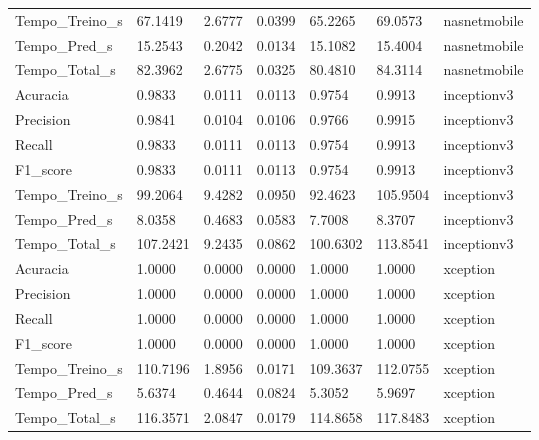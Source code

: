 \begin{tabular}{lllllll}
Tempo_Treino_s & 67.1419 & 2.6777 & 0.0399 & 65.2265 & 69.0573 & nasnetmobile \\
Tempo_Pred_s & 15.2543 & 0.2042 & 0.0134 & 15.1082 & 15.4004 & nasnetmobile \\
Tempo_Total_s & 82.3962 & 2.6775 & 0.0325 & 80.4810 & 84.3114 & nasnetmobile \\
Acuracia & 0.9833 & 0.0111 & 0.0113 & 0.9754 & 0.9913 & inceptionv3 \\
Precision & 0.9841 & 0.0104 & 0.0106 & 0.9766 & 0.9915 & inceptionv3 \\
Recall & 0.9833 & 0.0111 & 0.0113 & 0.9754 & 0.9913 & inceptionv3 \\
F1_score & 0.9833 & 0.0111 & 0.0113 & 0.9754 & 0.9913 & inceptionv3 \\
Tempo_Treino_s & 99.2064 & 9.4282 & 0.0950 & 92.4623 & 105.9504 & inceptionv3 \\
Tempo_Pred_s & 8.0358 & 0.4683 & 0.0583 & 7.7008 & 8.3707 & inceptionv3 \\
Tempo_Total_s & 107.2421 & 9.2435 & 0.0862 & 100.6302 & 113.8541 & inceptionv3 \\
Acuracia & 1.0000 & 0.0000 & 0.0000 & 1.0000 & 1.0000 & xception \\
Precision & 1.0000 & 0.0000 & 0.0000 & 1.0000 & 1.0000 & xception \\
Recall & 1.0000 & 0.0000 & 0.0000 & 1.0000 & 1.0000 & xception \\
F1_score & 1.0000 & 0.0000 & 0.0000 & 1.0000 & 1.0000 & xception \\
Tempo_Treino_s & 110.7196 & 1.8956 & 0.0171 & 109.3637 & 112.0755 & xception \\
Tempo_Pred_s & 5.6374 & 0.4644 & 0.0824 & 5.3052 & 5.9697 & xception \\
Tempo_Total_s & 116.3571 & 2.0847 & 0.0179 & 114.8658 & 117.8483 & xception \\
\bottomrule
\end{tabular}
